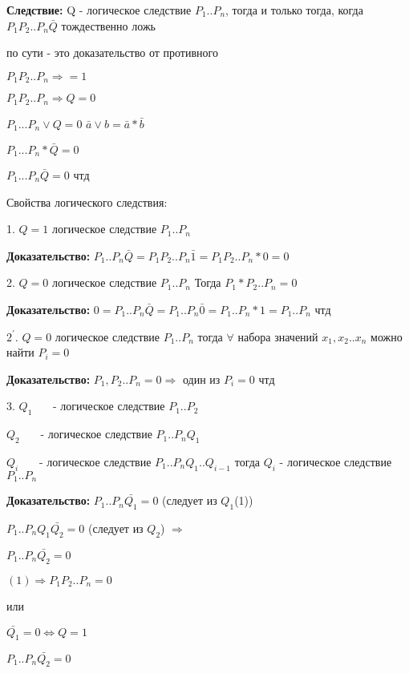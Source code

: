 \documentclass[russian]{lecture-notes}
\begin{document}
	\textbf{Следствие:} Q - логическое следствие $P_{1}..P_{n}$, тогда и только тогда, когда $P_{1}P_{2}..P_{n}\bar{Q}$ тождественно ложь

	\begin{remark}
		по сути - это доказательство от противного
		\end{remark}

	$P_{1}P_{2}..P_{n} \Rightarrow = 1$

	$P_{1}P_{2}..P_{n} \Rightarrow Q = 0 $

	$P_{1} ... P_{n} \lor Q = 0$ \quad $\bar{a} \lor b = \bar{a} * \bar{b}$

	$P_{1}... P_{n} * \bar{Q} = 0$

	$P_{1} ... P_{n} \bar{Q} = 0$ чтд

	Свойства логического следствия:

	1. $Q = 1$ логическое следствие $P_{1}..P_{n}$

	\textbf{Доказательство:} $P_{1}..P_{n} \bar{Q} = P_{1}P_{2}..P_{n} \bar{1} = P_{1}P_{2}..P_{n}*0 = 0$

	2. $Q = 0$ логическое следствие $P_{1}..P_{n}$
	Тогда $P_{1}*P_{2}..P_{n}=0$

	\textbf{Доказательство:} $0 = P_{1}..P_{n} \bar{Q} = P_{1}..P_{n} \bar{0} = P_{1}..P_{n}*1 = P_{1}..P_{n}$ чтд

	$2^{'}.$ $Q=0$ логическое следствие $P_{1}..P_{n}$ тогда $\forall$ набора значений $x_{1},x_{2}..x_{n}$ можно найти $P_{i}=0$

	\textbf{Доказательство: } $P_{1},P_{2}..P_{n} = 0 \Rightarrow $ один из $P_{i} = 0$ чтд

	3. $Q_{1}$ ~~~- логическое следствие $P_{1}..P_{2}$

	$Q_{2}$ ~~~- логическое следствие $P_{1}..P_{n} Q_{1}$

	$Q_{i}$ ~~~- логическое следствие $P_{1}..P_{n} Q_{1}..Q_{i-1}$ тогда $Q_{i}$ - логическое следствие $P_{1}..P_{n}$

	\textbf{Доказательство: } $P_{1}..P_{n} \bar{Q_{1}} = 0$ (следует из $Q_{1}$(1))

	$P_{1}..P_{n} Q_{1}\bar{Q_{2}} = 0$ (следует из $Q_{2}$) $\Rightarrow$

	$P_{1}..P_{n} \bar{Q_{2}} = 0$

	$(1) \Rightarrow P_{1}P_{2}..P_{n} = 0 $

	или

	$\bar{Q_{1}} = 0 \Leftrightarrow Q = 1$

	$P_{1}..P_{n} \bar{Q_{2}} = 0$
\end{document}
